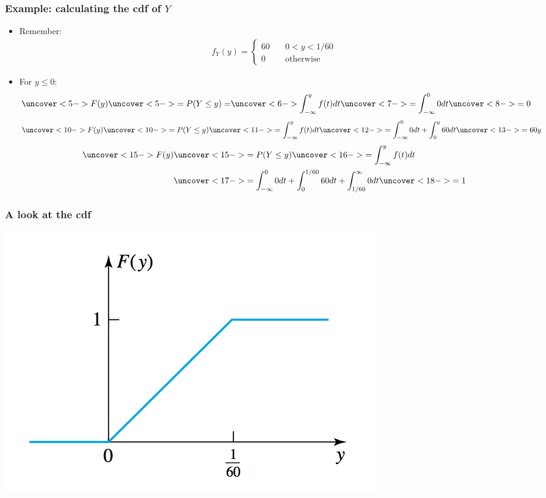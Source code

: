 \documentclass[handout]{beamer}\usepackage{graphicx, color}
\numberwithin{equation}{section}
\begin{document}
\begin{frame}
\frametitle{Example: calculating the cdf of $Y$} \scriptsize
\begin{itemize}
\pause \item Remember:
\pause \begin{align*}
f_Y(y) = \begin{cases}
60 & \quad 0 < y < 1/60 \\
0 & \quad \text{otherwise}
\end{cases}
\end{align*}
\pause \item For $y \le 0$:
\begin{align*}
\uncover<5->{F(y) } \uncover<5->{=P(Y \le y) =}\uncover<6->{ \int_{-\infty}^y f(t) dt}\uncover<7->{ = \int_{-\infty}^0 0 dt} \uncover<8->{= 0}
\end{align*}
\begin{align*}
\uncover<10->{F(y)} \uncover<10->{= P(Y \le y)} \uncover<11->{= \int_{-\infty}^y f(t) dt} \uncover<12->{= \int_{-\infty}^0 0 dt + \int_0^y 60 dt} \uncover<13->{= 60y }
\end{align*}
\begin{align*}
\uncover<15->{F(y)} &\uncover<15->{= P(Y \le y)} \uncover<16->{= \int_{-\infty}^y f(t) dt }\\
& \uncover<17->{= \int_{-\infty}^0 0 dt + \int_0^{1/60} 60 dt + \int_{1/60}^{\infty} 0 dt} \uncover<18->{ = 1}
\end{align*}
\end{itemize}
\end{frame}

\begin{frame}
\frametitle{A look at the cdf}
 \includegraphics{../../fig/delaycdfpic.png}
\end{frame}
\end{document}
